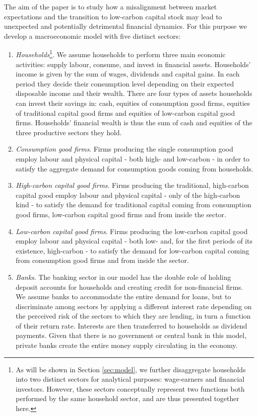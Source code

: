 \documentclass[authoryear]{article}
\begin{document}
The aim of the paper is to study how a misalignment between market expectations and the transition to low-carbon capital stock may lead to unexpected and potentially detrimental financial dynamics. For this purpose we develop a macroeconomic model with five distinct sectors:
\begin{enumerate}[noitemsep,nolistsep,leftmargin=*]
\item \emph{Households}\footnote{As will be shown in Section \ref{sec:model}, we further disaggregate households into two distinct sectors for analytical purposes: wage-earners and financial investors. However, these sectors conceptually represent two functions both performed by the same household sector, and are thus presented together here.}.
We assume households to perform three main economic activities: supply labour, consume, and invest in financial assets. Households' income is given by the sum of wages, dividends and capital gains. In each period they decide their consumption level depending on their expected disposable income and their wealth. There are four types of assets households can invest their savings in: cash, equities of consumption good firms, equities of traditional capital good firms and equities of low-carbon capital good firms. Households' financial wealth is thus the sum of cash and equities of the three productive sectors they hold. 
\item \emph{Consumption good firms}. Firms producing the single consumption good employ labour and physical capital - both high- and low-carbon - in order to satisfy the aggregate demand for consumption goods coming from households.
\item \emph{High-carbon capital good firms}. Firms producing the traditional, high-carbon capital good employ labour and physical capital - only of the high-carbon kind - to satisfy the demand for traditional capital coming from consumption good firms, low-carbon capital good firms and from inside the sector. 
\item \emph{Low-carbon capital good firms}. Firms producing the low-carbon capital good employ labour and physical capital - both low- and, for the first periods of its existence, high-carbon - to satisfy the demand for low-carbon capital coming from consumption good firms and from inside the sector. 
\item \emph{Banks}. The banking sector in our model has the double role of holding deposit accounts for households and creating credit for non-financial firms. We assume banks to accommodate the entire demand for loans, but to discriminate among sectors by applying a different interest rate depending on the perceived risk of the sectors to which they are lending, in turn a function of their return rate. Interests are then transferred to households as dividend payments. Given that there is no government or central bank in this model, private banks create the entire money supply circulating in the economy. \\
\end{enumerate}
\end{document}

